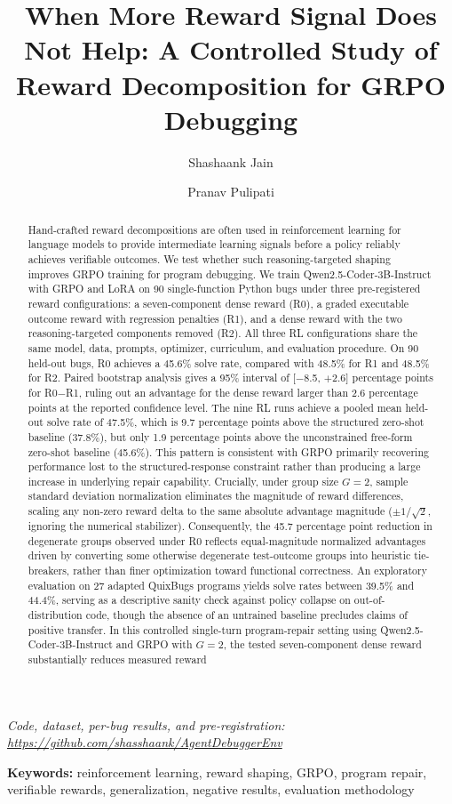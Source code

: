 \documentclass{article}
\title{When More Reward Signal Does Not Help: A Controlled Study of Reward Decomposition for GRPO Debugging}
\author{Shashaank Jain \and Pranav Pulipati}
\begin{document}
\maketitle

\begin{center}
\textit{Code, dataset, per-bug results, and pre-registration: \url{https://github.com/shasshaank/AgentDebuggerEnv}}
\end{center}

\vspace{0.3cm}
\noindent \textbf{Keywords:} reinforcement learning, reward shaping, GRPO, program repair, verifiable rewards, generalization, negative results, evaluation methodology
\vspace{0.3cm}

\begin{abstract}
Hand-crafted reward decompositions are often used in reinforcement learning for language models to provide intermediate learning signals before a policy reliably achieves verifiable outcomes. We test whether such reasoning-targeted shaping improves GRPO training for program debugging. We train Qwen2.5-Coder-3B-Instruct with GRPO and LoRA on 90 single-function Python bugs under three pre-registered reward configurations: a seven-component dense reward (R0), a graded executable outcome reward with regression penalties (R1), and a dense reward with the two reasoning-targeted components removed (R2). All three RL configurations share the same model, data, prompts, optimizer, curriculum, and evaluation procedure. On 90 held-out bugs, R0 achieves a 45.6\% solve rate, compared with 48.5\% for R1 and 48.5\% for R2. Paired bootstrap analysis gives a 95\% interval of [$-$8.5, $+$2.6] percentage points for R0$-$R1, ruling out an advantage for the dense reward larger than 2.6 percentage points at the reported confidence level. The nine RL runs achieve a pooled mean held-out solve rate of 47.5\%, which is 9.7 percentage points above the structured zero-shot baseline (37.8\%), but only 1.9 percentage points above the unconstrained free-form zero-shot baseline (45.6\%). This pattern is consistent with GRPO primarily recovering performance lost to the structured-response constraint rather than producing a large increase in underlying repair capability. Crucially, under group size $G=2$, sample standard deviation normalization eliminates the magnitude of reward differences, scaling any non-zero reward delta to the same absolute advantage magnitude ($\pm 1/\sqrt{2}$, ignoring the numerical stabilizer). Consequently, the 45.7 percentage point reduction in degenerate groups observed under R0 reflects equal-magnitude normalized advantages driven by converting some otherwise degenerate test-outcome groups into heuristic tie-breakers, rather than finer optimization toward functional correctness. An exploratory evaluation on 27 adapted QuixBugs programs yields solve rates between 39.5\% and 44.4\%, serving as a descriptive sanity check against policy collapse on out-of-distribution code, though the absence of an untrained baseline precludes claims of positive transfer. In this controlled single-turn program-repair setting using Qwen2.5-Coder-3B-Instruct and GRPO with $G=2$, the tested seven-component dense reward substantially reduces measured reward 
\end{abstract}
\end{document}

